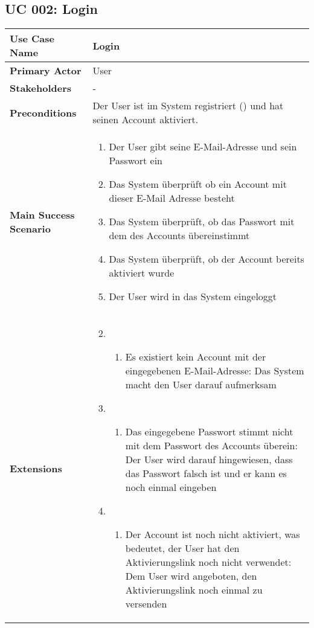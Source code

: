 \subsection{UC 002: Login}
\label{uc:002-login}

\begin{tabular}{|l|p{}|}
\hline
\textbf{Use Case Name} 	&	Login	\\ \hline
\textbf{Primary Actor} 	&	User	\\ \hline
\textbf{Stakeholders}	&	-	\\ \hline
\textbf{Preconditions}	&	Der User ist im System registriert (\nameref{uc:001-register}) und hat seinen Account aktiviert.	\\ \hline
\textbf{Main Success Scenario}	& 	
\begin{enumerate}
	\item Der User gibt seine E-Mail-Adresse und sein Passwort ein
	\item Das System überprüft ob ein Account mit dieser E-Mail Adresse besteht
	\item Das System überprüft, ob das Passwort mit dem des Accounts übereinstimmt
	\item Das System überprüft, ob der Account bereits aktiviert wurde
	\item Der User wird in das System eingeloggt
\end{enumerate}
\\ \hline
\textbf{Extensions}	& 	
\begin{enumerate}
\setcounter{enumi}{1}
    \item
    \begin{enumerate}
    \item Es existiert kein Account mit der eingegebenen E-Mail-Adresse: Das System macht den User darauf aufmerksam
    \end{enumerate}
    \item
    \begin{enumerate}
    \item Das eingegebene Passwort stimmt nicht mit dem Passwort des Accounts überein: Der User wird darauf hingewiesen, dass das Passwort falsch ist und er kann es noch einmal eingeben
    \end{enumerate}
    \item
    \begin{enumerate}
    \item Der Account ist noch nicht aktiviert, was bedeutet, der User hat den Aktivierungslink noch nicht verwendet: Dem User wird angeboten, den Aktivierungslink noch einmal zu versenden
    \end{enumerate}
\end{enumerate}
\\ \hline
\end{tabular}
